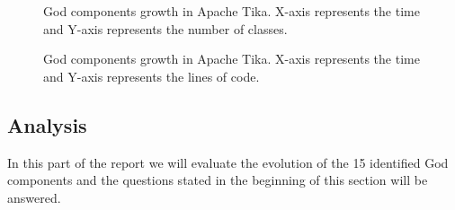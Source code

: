 \documentclass{article}
\begin{document}
\begin{figure}[ht]
    \centering
    
    \label{fig:class_growth}
    \caption{God components growth in Apache Tika. X-axis represents the time and Y-axis represents the number of classes.}
\end{figure}
\begin{figure}[ht]
    \centering
    
    \label{fig:loc_growth}
    \caption{God components growth in Apache Tika. X-axis represents the time and Y-axis represents the lines of code.}
\end{figure}
\subsection{Analysis}
In this part of the report we will evaluate the evolution of the 15 identified God components and the questions stated in the beginning of this section will be answered.\\
\end{document}

